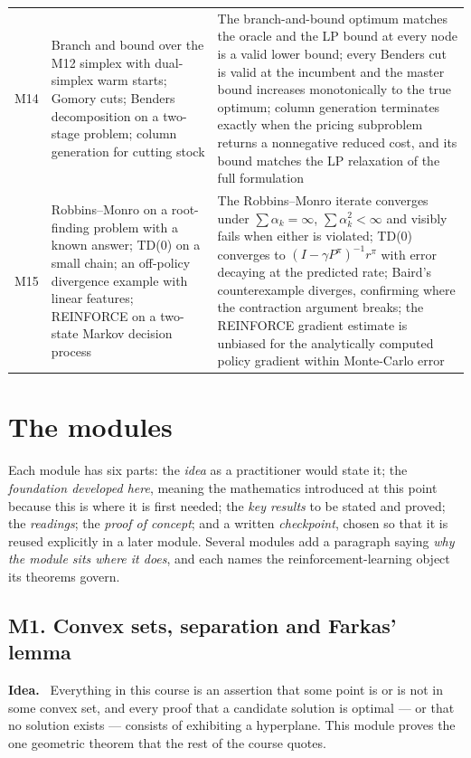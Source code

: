 \documentclass[11pt,a4paper]{article}
\newcommand{\mpart}[1]{\smallskip\noindent\textbf{#1}\ \ignorespaces}
\begin{document}
\begin{longtable}{@{}L{0.9cm} L{6.2cm} L{7.3cm}@{}}
M14 & Branch and bound over the M12 simplex with dual-simplex warm starts; Gomory cuts;
      Benders decomposition on a two-stage problem; column generation for cutting stock
    & The branch-and-bound optimum matches the oracle and the LP bound at every node is a
      valid lower bound; every Benders cut is valid at the incumbent and the master bound
      increases monotonically to the true optimum; column generation terminates exactly when
      the pricing subproblem returns a nonnegative reduced cost, and its bound matches the
      LP relaxation of the full formulation \\

M15 & Robbins--Monro on a root-finding problem with a known answer; TD(0) on a small chain;
      an off-policy divergence example with linear features; REINFORCE on a two-state Markov
      decision process
    & The Robbins--Monro iterate converges under $\sum\alpha_k=\infty$, $\sum\alpha_k^2<\infty$
      and visibly fails when either is violated; TD(0) converges to
      $(I-\gamma P^\pi)^{-1}r^\pi$ with error decaying at the predicted rate; Baird's
      counterexample diverges, confirming where the contraction argument breaks; the
      REINFORCE gradient estimate is unbiased for the analytically computed policy gradient
      within Monte-Carlo error \\
\end{longtable}

\clearpage

\section{The modules}

Each module has six parts: the \emph{idea} as a practitioner would state it; the
\emph{foundation developed here}, meaning the mathematics introduced at this point because
this is where it is first needed; the \emph{key results} to be stated and proved; the
\emph{readings}; the \emph{proof of concept}; and a written \emph{checkpoint}, chosen so that
it is reused explicitly in a later module. Several modules add a paragraph saying \emph{why
the module sits where it does}, and each names the reinforcement-learning object its theorems
govern.

\subsection{M1. Convex sets, separation and Farkas' lemma}

\mpart{Idea.} Everything in this course is an assertion that some point is or is not in some
convex set, and every proof that a candidate solution is optimal --- or that no solution
exists --- consists of exhibiting a hyperplane. This module proves the one geometric theorem
that the rest of the course quotes.
\end{document}
